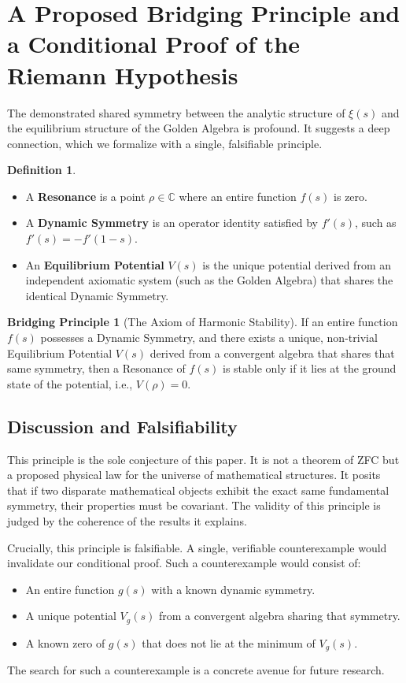 \documentclass{article}
\theoremstyle{plain}
\theoremstyle{definition}
\newtheorem{definition}[theorem]{Definition}
\newtheorem{conjecture}{Bridging Principle}
\theoremstyle{remark}
\begin{document}
\section{A Proposed Bridging Principle and a Conditional Proof of the Riemann Hypothesis}
The demonstrated shared symmetry between the analytic structure of $\xi(s)$ and the equilibrium structure of the Golden Algebra is profound. It suggests a deep connection, which we formalize with a single, falsifiable principle.

\begin{definition}
\begin{itemize}
    \item A \textbf{Resonance} is a point $\rho \in \mathbb{C}$ where an entire function $f(s)$ is zero.
    \item A \textbf{Dynamic Symmetry} is an operator identity satisfied by $f'(s)$, such as $f'(s) = -f'(1-s)$.
    \item An \textbf{Equilibrium Potential} $V(s)$ is the unique potential derived from an independent axiomatic system (such as the Golden Algebra) that shares the identical Dynamic Symmetry.
\end{itemize}
\end{definition}

\begin{conjecture}[The Axiom of Harmonic Stability]
\label{conj:stability}
If an entire function $f(s)$ possesses a Dynamic Symmetry, and there exists a unique, non-trivial Equilibrium Potential $V(s)$ derived from a convergent algebra that shares that same symmetry, then a Resonance of $f(s)$ is stable only if it lies at the ground state of the potential, i.e., $V(\rho)=0$.
\end{conjecture}

\subsection{Discussion and Falsifiability}
This principle is the sole conjecture of this paper. It is not a theorem of ZFC but a proposed physical law for the universe of mathematical structures. It posits that if two disparate mathematical objects exhibit the exact same fundamental symmetry, their properties must be covariant. The validity of this principle is judged by the coherence of the results it explains.

Crucially, this principle is falsifiable. A single, verifiable counterexample would invalidate our conditional proof. Such a counterexample would consist of:
\begin{itemize}
    \item An entire function $g(s)$ with a known dynamic symmetry.
    \item A unique potential $V_g(s)$ from a convergent algebra sharing that symmetry.
    \item A known zero of $g(s)$ that does not lie at the minimum of $V_g(s)$.
\end{itemize}
The search for such a counterexample is a concrete avenue for future research.
\end{document}
